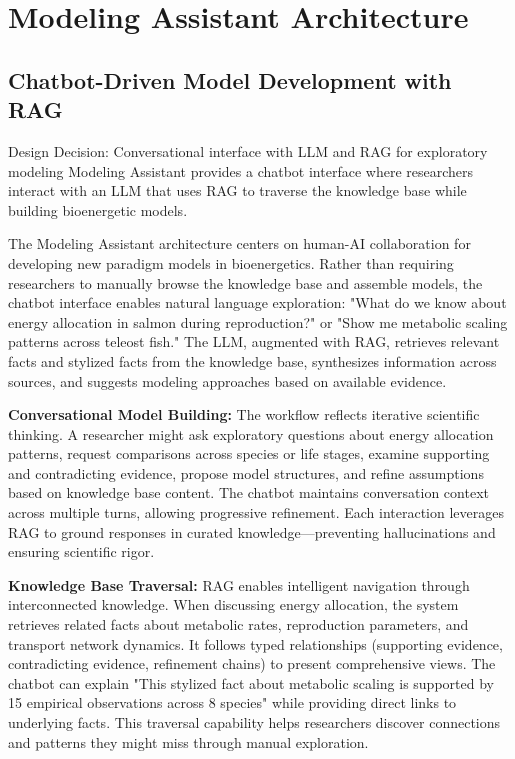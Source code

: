 \documentclass[12pt,a4paper]{article}
\begin{document}
\section{Modeling Assistant Architecture}

\subsection{Chatbot-Driven Model Development with RAG}

\begin{rationale}{Design Decision: Conversational interface with LLM and RAG for exploratory modeling}
Modeling Assistant provides a chatbot interface where researchers interact with an LLM that uses RAG to traverse the knowledge base while building bioenergetic models.
\end{rationale}

The Modeling Assistant architecture centers on human-AI collaboration for developing new paradigm models in bioenergetics. Rather than requiring researchers to manually browse the knowledge base and assemble models, the chatbot interface enables natural language exploration: "What do we know about energy allocation in salmon during reproduction?" or "Show me metabolic scaling patterns across teleost fish." The LLM, augmented with RAG, retrieves relevant facts and stylized facts from the knowledge base, synthesizes information across sources, and suggests modeling approaches based on available evidence.

\textbf{Conversational Model Building:} The workflow reflects iterative scientific thinking. A researcher might ask exploratory questions about energy allocation patterns, request comparisons across species or life stages, examine supporting and contradicting evidence, propose model structures, and refine assumptions based on knowledge base content. The chatbot maintains conversation context across multiple turns, allowing progressive refinement. Each interaction leverages RAG to ground responses in curated knowledge—preventing hallucinations and ensuring scientific rigor.

\textbf{Knowledge Base Traversal:} RAG enables intelligent navigation through interconnected knowledge. When discussing energy allocation, the system retrieves related facts about metabolic rates, reproduction parameters, and transport network dynamics. It follows typed relationships (supporting evidence, contradicting evidence, refinement chains) to present comprehensive views. The chatbot can explain "This stylized fact about metabolic scaling is supported by 15 empirical observations across 8 species" while providing direct links to underlying facts. This traversal capability helps researchers discover connections and patterns they might miss through manual exploration.
\end{document}
